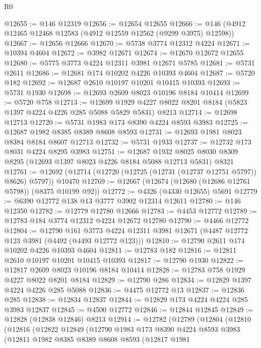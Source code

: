 \begin{lexlean}{R0}
\begin{coremodule}
@12655 := @146 @12319
@12656 := @12654 @12655
@12666 := @146 (@4912 @12465 @12468 @12583 (@4912 @12559 @12562 (@9299 @3975) @12598))
@12667 := @12656 @12666
@12670 := @5738 @3774 @12312 @4224
@12671 := @10394 @4604
@12672 := @3982 @12671
@12674 := @12670 @12672 @12655
@12680 := @5775 @3773 @4224 @12311 @3981 @12671 @5785
@12681 := @5731 @2611
@12686 := @12681 @174 @10202 @4226 @10393 @4604
@12687 := @5720 @182
@12692 := @12687 @2610 @10197 @10201 @10415 @10393
@12693 := @5731 @1930
@12698 := @12693 @2609 @8023 @10196 @8184 @10414
@12699 := @5720 @758
@12713 := @12699
    @1929
    @4227
    @8022
    @8201
    @8184
    (@5823 @1397 @4224 @4226 @285 @5088 @5829 @5831)
    @8213
@12714 := @12698 @12713
@12720 := @5731 @1983 @173 @8390 @4224 @8593 @3983
@12725 := @12687 @1982 @8385 @8389 @8608 @8593
@12731 := @12693 @1981 @8023 @8384 @8184 @8607 @12713
@12732 := @5731 @1933
@12737 := @12732 @173 @8031 @4224 @8295 @3983
@12751 := @12687
    @1932
    @8025
    @8030
    @8309
    @8295
    (@12693 @1397 @8023 @4226 @8184 @5088 @12713 @5831)
    @8321
@12761 := @12692 (@12714 (@12720 (@12725 (@12731 (@12737 @12751 @5797)) @8626) @5797)) @10470
@12769 := @12667 (@12674 (@12680 (@12686 @12761 @5798)) (@8375 @10199 @92))
@12772 := @4326 (@4330 @12655) @5691
@12779 := @6390 @12772 @138 @13 @3777 @3902 @12314 @12611
@12780 := @146 @12350
@12782 := @12779 @12780 @12666
@12783 := @4453 @12772
@12789 := @12783 @184 @3774 @12312 @4224 @12672 @12780
@12790 := @4466 @12772
@12804 := @12790
    @161
    @3773
    @4224
    @12311
    @3981
    @12671
    (@4487 @12772 @123 @3981 (@4492 (@4493 @12772 @123)))
@12810 := @12790 @2611 @174 @10202 @4226 @10393 @4604
@12811 := @12783 @182
@12816 := @12811 @2610 @10197 @10201 @10415 @10393
@12817 := @12790 @1930
@12822 := @12817 @2609 @8023 @10196 @8184 @10414
@12828 := @12783 @758 @1929 @4227 @8022 @8201 @8184
@12829 := @12790 @286
@12834 := @12829 @1397 @4224 @4226 @285 @5088
@12836 := @4475 @12772 @13
@12837 := @12836 @285
@12838 := @12834 @12837
@12844 := @12829 @173 @4224 @4224 @285 @3983 @12837
@12845 := @4500 @12772
@12846 := @12844 @12845
@12849 := @12828 (@12838 @12846) @8213
@12914 := @12782
    (@12789
      (@12804
        (@12810
          (@12816
            (@12822
              @12849
              (@12790
                @1983
                @173
                @8390
                @4224
                @8593
                @3983
                (@12811
                  @1982
                  @8385
                  @8389
                  @8608
                  @8593
                  (@12817
                    @1981

\end{coremodule}
\end{lexlean}
